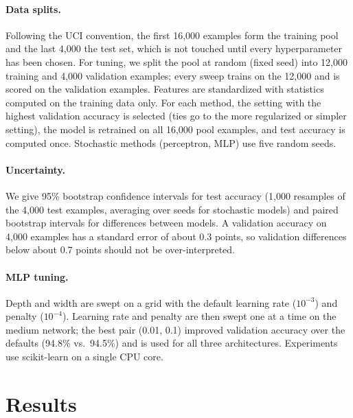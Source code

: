 \documentclass{article}
\begin{document}
\paragraph{Data splits.} Following the UCI convention, the first 16,000 examples form the training pool and the last 4,000 the test set, which is not touched until every hyperparameter has been chosen. For tuning, we split the pool at random (fixed seed) into 12,000 training and 4,000 validation examples; every sweep trains on the 12,000 and is scored on the validation examples. Features are standardized with statistics computed on the training data only. For each method, the setting with the highest validation accuracy is selected (ties go to the more regularized or simpler setting), the model is retrained on all 16,000 pool examples, and test accuracy is computed once. Stochastic methods (perceptron, MLP) use five random seeds.

\paragraph{Uncertainty.} We give 95\% bootstrap confidence intervals for test accuracy (1,000 resamples of the 4,000 test examples, averaging over seeds for stochastic models) and paired bootstrap intervals for differences between models. A validation accuracy on 4,000 examples has a standard error of about 0.3 points, so validation differences below about 0.7 points should not be over-interpreted.

\paragraph{MLP tuning.} Depth and width are swept on a grid with the default learning rate ($10^{-3}$) and penalty ($10^{-4}$). Learning rate and penalty are then swept one at a time on the medium network; the best pair (0.01, 0.1) improved validation accuracy over the defaults (94.8\% vs.\ 94.5\%) and is used for all three architectures. Experiments use scikit-learn \citep{pedregosa2011scikit} on a single CPU core.

\section{Results}
\end{document}
